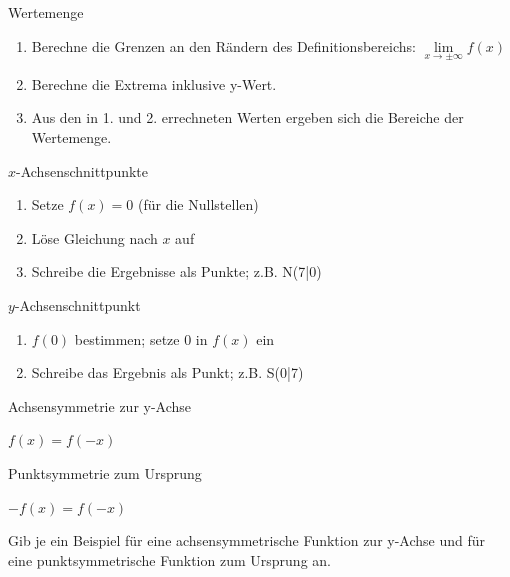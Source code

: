 \documentclass[paper=a6,landscape,ngerman,twoside=true,fontsize=12pt]{scrartcl}
\begin{document}
\begin{frage}
	Wertemenge
\end{frage}
\begin{antwort}
	\begin{enumerate}
		\item Berechne die Grenzen an den Rändern des Definitionsbereichs: $\lim\limits_{x \rightarrow\pm\infty}{f(x)}$
		\item Berechne die Extrema inklusive y-Wert.
		\item Aus den in 1. und 2. errechneten Werten ergeben sich die Bereiche der Wertemenge.
	\end{enumerate}
\end{antwort}
\begin{frage}
	$x$-Achsenschnittpunkte
\end{frage}
\begin{antwort}
	\begin{enumerate}
		\item Setze $f(x)=0$ (für die Nullstellen)
		\item Löse Gleichung nach $x$ auf
		\item Schreibe die Ergebnisse als Punkte; z.B. N(7|0)
	\end{enumerate}
\end{antwort}
\begin{frage}
	$y$-Achsenschnittpunkt
\end{frage}
\begin{antwort}
	\begin{enumerate}
		\item $f(0)$ bestimmen; setze $0$ in $f(x)$ ein
		\item Schreibe das Ergebnis als Punkt; z.B. S(0|7)
	\end{enumerate}
\end{antwort}
\begin{frage}
	Achsensymmetrie zur y-Achse
\end{frage}
\begin{antwort}
	\LARGE	$f(x)=f(-x)$ 
\end{antwort}
\begin{frage}
	Punktsymmetrie zum Ursprung
\end{frage}
\begin{antwort}
	\LARGE	 $-f(x)=f(-x)$
\end{antwort}
\begin{frage}
	Gib je ein Beispiel für eine achsensymmetrische Funktion zur y-Achse und für eine punktsymmetrische Funktion zum Ursprung an.
\end{frage}
\end{document}
